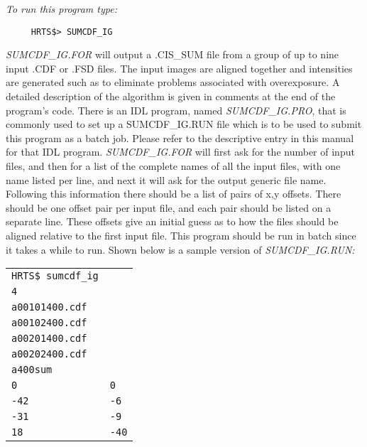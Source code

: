 {\em To run this program type:}
\begin{verbatim}
     HRTS$> SUMCDF_IG              
\end{verbatim}
{\em SUMCDF\_IG.FOR} will output a .CIS\_SUM file from a group of up to nine
   input .CDF or .FSD files.  The input images are aligned together and
   intensities are generated such as to eliminate problems associated with
   overexposure.  A detailed description of the algorithm is given in
   comments at the end of the program's code.
      There is an IDL program, named {\it SUMCDF\_IG.PRO}, that is commonly used
   to set up a SUMCDF\_IG.RUN file which is to be used to submit this
   program as a batch job.  Please refer to the descriptive entry in this
   manual for that IDL program.
   {\em SUMCDF\_IG.FOR} will first ask for the number of input files, and then
   for a list of the complete names of all the input files, with one name
   listed per line, and next it will ask for the output generic file name.
   Following this information there should be a list of pairs of {x,y}
   offsets.  There should be one offset pair per input file, and each pair
   should be listed on a separate line.  These offsets give an initial
   guess as to how the files should be aligned relative to the first input
   file.  This program should be run in batch since it takes a while to
   run.  Shown below is a sample version of {\em SUMCDF\_IG.RUN:}
\begin{center}   
\begin{tabular}{||l l||}   
\hline   

                  {\tt HRTS\$ sumcdf\_ig} & \\                        
                  {\tt 4}   &  \\                               
                  {\tt a00101400.cdf} & \\                      
                  {\tt a00102400.cdf} & \\                      
                  {\tt a00201400.cdf} & \\                      
                  {\tt a00202400.cdf} & \\                      
                  {\tt a400sum}       & \\                            
                    {\tt 0}  &    {\tt 0}  \\                         
                  {\tt -42}  &   {\tt -6}  \\                         
                  {\tt -31}  &   {\tt -9}  \\                         
                   {\tt 18} &    {\tt -40} \\                        
\hline                 
\end{tabular}   
\end{center}
\newpage

